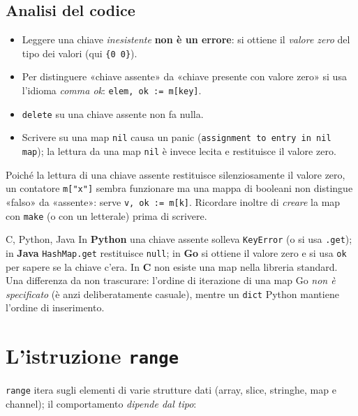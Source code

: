\documentclass[11pt,a4paper]{report}
\newcommand{\cod}[1]{\texttt{#1}}
\begin{document}
\subsection{Analisi del codice}

\begin{itemize}
  \item Leggere una chiave \emph{inesistente} \textbf{non è un errore}: si ottiene il
        \emph{valore zero} del tipo dei valori (qui \cod{\{0 0\}}).
  \item Per distinguere «chiave assente» da «chiave presente con valore zero» si
        usa l'idioma \emph{comma ok}: \cod{elem, ok := m[key]}.
  \item \cod{delete} su una chiave assente non fa nulla.
  \item Scrivere su una map \cod{nil} causa un panic
        (\texttt{assignment to entry in nil map}); la lettura da una map \cod{nil}
        è invece lecita e restituisce il valore zero.
\end{itemize}

\begin{attenzione}
Poiché la lettura di una chiave assente restituisce silenziosamente il valore
zero, un contatore \cod{m["x"]} sembra funzionare ma una mappa di booleani
non distingue «falso» da «assente»: serve \cod{v, ok := m[k]}. Ricordare inoltre di
\emph{creare} la map con \cod{make} (o con un letterale) prima di scrivere.
\end{attenzione}

\begin{confronto}{C, Python, Java}
In \textbf{Python} una chiave assente solleva \cod{KeyError} (o si usa
\cod{.get}); in \textbf{Java} \cod{HashMap.get} restituisce \cod{null}; in
\textbf{Go} si ottiene il valore zero e si usa \cod{ok} per sapere se la chiave
c'era. In \textbf{C} non esiste una map nella libreria standard. Una differenza
da non trascurare: l'ordine di iterazione di una map Go \emph{non è
specificato} (è anzi deliberatamente casuale), mentre un \cod{dict} Python
mantiene l'ordine di inserimento.
\end{confronto}

\section{L'istruzione \texttt{range}}\label{sec:range}

\cod{range} itera sugli elementi di varie strutture dati (array, slice,
stringhe, map e channel); il comportamento \emph{dipende dal tipo}:
\end{document}

